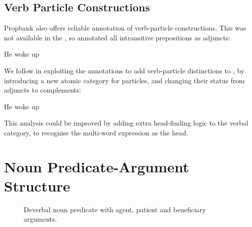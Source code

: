 \documentclass[11pt]{article}
\begin{document}
\subsection{Verb Particle Constructions}

Propbank also offers reliable annotation of verb-particle constructions. This
was not available in the \penn, so \citet{hock:cl07} annotated all intransitive
prepositions as adjuncts:

\begin{lexamples}
 \item \gll He woke up
         
       \gln 
       \glend \label{ccgbank_vpc}
\end{lexamples}

We follow \citet{constable:09} in exploiting the
\propbank annotations to add verb-particle distinctions to \ccgbank, by
introducing a new atomic category  for particles, and changing their status
from adjuncts to complements:

\begin{lexamples}
 \item \gll He woke up
         
       \gln 
       \glend \label{ccgbank_vpc}
\end{lexamples}

This analysis could be improved by adding extra head-finding logic to the
verbal category, to recognise the multi-word expression as the head.

\section{Noun Predicate-Argument Structure}
\label{sec:nom_parg}

\begin{figure*}
\centering
{}
\caption{\small Deverbal noun predicate with agent, patient and
beneficiary arguments.\label{fig:gift}}
\end{figure*}
\end{document}
